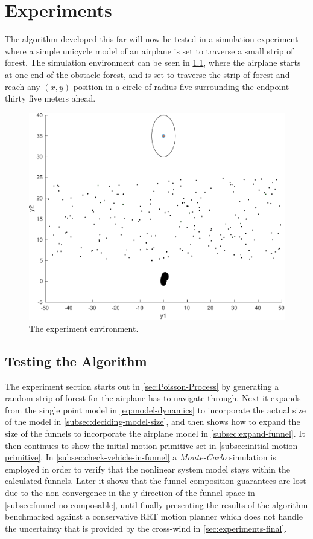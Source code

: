 \chapter{Experiments}
\label{chp:experiments}

The \rrtfunnel{} algorithm developed this far will now be tested in a simulation
experiment where a simple unicycle model of an airplane is set to traverse a
small strip of forest. The simulation environment can be seen in
\cref{fig:simulated-forest}, where the airplane starts at one end of the
obstacle forest, and is set to traverse the strip of forest and reach any
\((x,y)\) position in a circle of radius five surrounding the endpoint thirty
five meters ahead.

\begin{figure}
  \centering
  \includegraphics[width=.8\textwidth]{figures/experiments/simulated-forest}
  \caption{The experiment environment.}
  \label{fig:simulated-forest}
\end{figure}

\section{Testing the \rrtfunnel{} Algorithm}

The experiment section starts out in \cref{sec:Poisson-Process} by generating a
random strip of forest for the airplane has to navigate through. Next it expands
from the single point model in \cref{eq:model-dynamics} to incorporate the
actual size of the model in \cref{subsec:deciding-model-size}, and then shows
how to expand the size of the funnels to incorporate the airplane model in
\cref{subsec:expand-funnel}. It then continues to show the initial motion
primitive set in \cref{subsec:initial-motion-primitive}. In
\cref{subsec:check-vehicle-in-funnel} a \textit{Monte-Carlo} simulation is
employed in order to verify that the nonlinear system model stays within the
calculated funnels. Later it shows that the funnel composition guarantees are
lost due to the non-convergence in the y-direction of the funnel space in
\cref{subsec:funnel-no-composable}, until finally presenting the results of the
\rrtfunnel{} algorithm benchmarked against a conservative \ac{RRT} motion
planner which does not handle the uncertainty that is provided by the cross-wind
in \cref{sec:experiments-final}.

